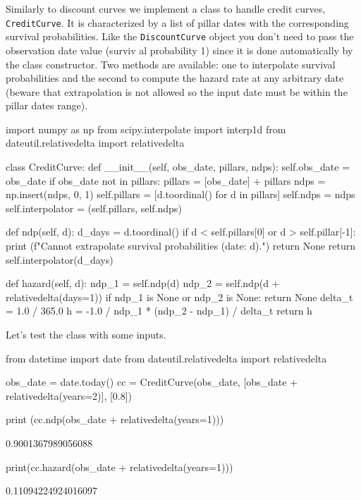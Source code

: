 \begin{finmarkets}
	Similarly to discount curves we implement a class to handle credit curves, \texttt{CreditCurve}. It is characterized by a list of pillar dates with the corresponding survival probabilities. Like the \texttt{DiscountCurve} object you don't need to pass the observation date value (surviv
	al probability 1) since it is done automatically by the class constructor. Two methods are available: one to interpolate survival probabilities and the second to compute the hazard rate at any arbitrary date (beware that extrapolation is not allowed so the input date must be within the pillar dates range).
\end{finmarkets}

\begin{ipython}
	import numpy as np
	from scipy.interpolate import interp1d
	from dateutil.relativedelta import relativedelta
	
	class CreditCurve:
	def __init__(self, obs_date, pillars, ndps):
	self.obs_date = obs_date
	if obs_date not in pillars:
	pillars = [obs_date] + pillars
	ndps = np.insert(ndps, 0, 1)
	self.pillars = [d.toordinal() for d in pillars]
	self.ndps = ndps
	self.interpolator = (self.pillars, self.ndps)
	
	def ndp(self, d):
	d_days = d.toordinal()
	if d < self.pillars[0] or d > self.pillar[-1]:
	print (f"Cannot extrapolate survival probabilities (date: {d}).")
	return None
	return self.interpolator(d_days)
	
	def hazard(self, d):
	ndp_1 = self.ndp(d)
	ndp_2 = self.ndp(d + relativedelta(days=1))
	if ndp_1 is None or ndp_2 is None:
	return None
	delta_t = 1.0 / 365.0
	h = -1.0 / ndp_1 * (ndp_2 - ndp_1) / delta_t
	return h
\end{ipython}

Let's test the class with some inputs.
\begin{ipython}
	from datetime import date
	from dateutil.relativedelta import relativedelta
	
	obs_date = date.today()
	cc = CreditCurve(obs_date, [obs_date + relativedelta(years=2)], [0.8])
	
	print (cc.ndp(obs_date + relativedelta(years=1)))
\end{ipython}
\begin{ioutput}
	0.9001367989056088
\end{ioutput}
\begin{ipython}
	print(cc.hazard(obs_date + relativedelta(years=1)))
\end{ipython}
\begin{ioutput}
	0.11094224924016097
\end{ioutput}

